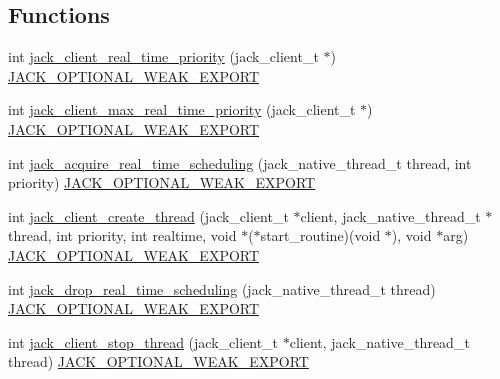 \subsection*{\-Functions}
\begin{DoxyCompactItemize}
\item 
int \hyperlink{group__ClientThreads_ga4ee2fcbb266618d66a2cf354d8c54359}{jack\-\_\-client\-\_\-real\-\_\-time\-\_\-priority} (jack\-\_\-client\-\_\-t $\ast$) \hyperlink{weakmacros_8h_adf1bde0dd996bbf61a44311165014dd1}{\-J\-A\-C\-K\-\_\-\-O\-P\-T\-I\-O\-N\-A\-L\-\_\-\-W\-E\-A\-K\-\_\-\-E\-X\-P\-O\-R\-T}
\item 
int \hyperlink{group__ClientThreads_gaa266166c958e1b745ce48ef7ca89890f}{jack\-\_\-client\-\_\-max\-\_\-real\-\_\-time\-\_\-priority} (jack\-\_\-client\-\_\-t $\ast$) \hyperlink{weakmacros_8h_adf1bde0dd996bbf61a44311165014dd1}{\-J\-A\-C\-K\-\_\-\-O\-P\-T\-I\-O\-N\-A\-L\-\_\-\-W\-E\-A\-K\-\_\-\-E\-X\-P\-O\-R\-T}
\item 
int \hyperlink{group__ClientThreads_gaec301b7cb1dcd39d7fc88fa9f769dab8}{jack\-\_\-acquire\-\_\-real\-\_\-time\-\_\-scheduling} (jack\-\_\-native\-\_\-thread\-\_\-t thread, int priority) \hyperlink{weakmacros_8h_adf1bde0dd996bbf61a44311165014dd1}{\-J\-A\-C\-K\-\_\-\-O\-P\-T\-I\-O\-N\-A\-L\-\_\-\-W\-E\-A\-K\-\_\-\-E\-X\-P\-O\-R\-T}
\item 
int \hyperlink{group__ClientThreads_ga522094adfc39ec4770d8e82bd601e365}{jack\-\_\-client\-\_\-create\-\_\-thread} (jack\-\_\-client\-\_\-t $\ast$client, jack\-\_\-native\-\_\-thread\-\_\-t $\ast$thread, int priority, int realtime, void $\ast$($\ast$start\-\_\-routine)(void $\ast$), void $\ast$arg) \hyperlink{weakmacros_8h_adf1bde0dd996bbf61a44311165014dd1}{\-J\-A\-C\-K\-\_\-\-O\-P\-T\-I\-O\-N\-A\-L\-\_\-\-W\-E\-A\-K\-\_\-\-E\-X\-P\-O\-R\-T}
\item 
int \hyperlink{group__ClientThreads_ga0d75ca78f4088f515f1befc108f3f2e7}{jack\-\_\-drop\-\_\-real\-\_\-time\-\_\-scheduling} (jack\-\_\-native\-\_\-thread\-\_\-t thread) \hyperlink{weakmacros_8h_adf1bde0dd996bbf61a44311165014dd1}{\-J\-A\-C\-K\-\_\-\-O\-P\-T\-I\-O\-N\-A\-L\-\_\-\-W\-E\-A\-K\-\_\-\-E\-X\-P\-O\-R\-T}
\item 
int \hyperlink{group__ClientThreads_ga2a9f33ed2464d4b110a27c9c35792b24}{jack\-\_\-client\-\_\-stop\-\_\-thread} (jack\-\_\-client\-\_\-t $\ast$client, jack\-\_\-native\-\_\-thread\-\_\-t thread) \hyperlink{weakmacros_8h_adf1bde0dd996bbf61a44311165014dd1}{\-J\-A\-C\-K\-\_\-\-O\-P\-T\-I\-O\-N\-A\-L\-\_\-\-W\-E\-A\-K\-\_\-\-E\-X\-P\-O\-R\-T}
\item 

\end{DoxyCompactItemize}

